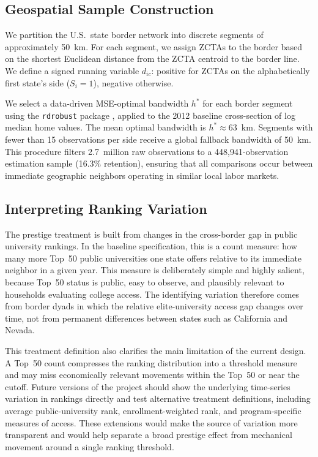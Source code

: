 \documentclass[12pt]{article}
\begin{document}
\subsection{Geospatial Sample Construction}

We partition the U.S.\ state border network into discrete segments of approximately 50~km. For each segment, we assign ZCTAs to the border based on the shortest Euclidean distance from the ZCTA centroid to the border line. We define a signed running variable $d_{ic}$: positive for ZCTAs on the alphabetically first state's side ($S_i = 1$), negative otherwise.

We select a data-driven MSE-optimal bandwidth $h^*$ for each border segment using the \texttt{rdrobust} package \citep{calonico2014robust}, applied to the 2012 baseline cross-section of log median home values. The mean optimal bandwidth is $h^* \approx 63$~km. Segments with fewer than 15 observations per side receive a global fallback bandwidth of 50~km. This procedure filters 2.7~million raw observations to a 448,941-observation estimation sample (16.3\% retention), ensuring that all comparisons occur between immediate geographic neighbors operating in similar local labor markets.

\subsection{Interpreting Ranking Variation}

The prestige treatment is built from changes in the cross-border gap in public university rankings. In the baseline specification, this is a count measure: how many more Top~50 public universities one state offers relative to its immediate neighbor in a given year. This measure is deliberately simple and highly salient, because Top~50 status is public, easy to observe, and plausibly relevant to households evaluating college access. The identifying variation therefore comes from border dyads in which the relative elite-university access gap changes over time, not from permanent differences between states such as California and Nevada.

This treatment definition also clarifies the main limitation of the current design. A Top~50 count compresses the ranking distribution into a threshold measure and may miss economically relevant movements within the Top~50 or near the cutoff. Future versions of the project should show the underlying time-series variation in rankings directly and test alternative treatment definitions, including average public-university rank, enrollment-weighted rank, and program-specific measures of access. These extensions would make the source of variation more transparent and would help separate a broad prestige effect from mechanical movement around a single ranking threshold.
\end{document}

